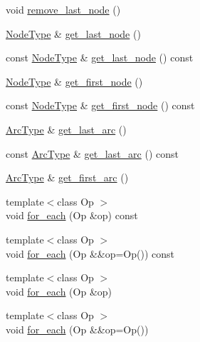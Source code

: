\begin{DoxyCompactItemize}
\item 
void \hyperlink{class_designar_1_1_path_a88a313439c8f4ea01f72d469b328039f}{remove\+\_\+last\+\_\+node} ()
\item 
\hyperlink{class_designar_1_1_path_a7b499fd50e96e3360968d4cfef7a3736}{Node\+Type} \& \hyperlink{class_designar_1_1_path_aff47c35e439520a807f2a83119a7937b}{get\+\_\+last\+\_\+node} ()
\item 
const \hyperlink{class_designar_1_1_path_a7b499fd50e96e3360968d4cfef7a3736}{Node\+Type} \& \hyperlink{class_designar_1_1_path_a4e80971589c8317a2e7f11c642ad2e19}{get\+\_\+last\+\_\+node} () const
\item 
\hyperlink{class_designar_1_1_path_a7b499fd50e96e3360968d4cfef7a3736}{Node\+Type} \& \hyperlink{class_designar_1_1_path_a7d45c6df09b310fc0c0a65bd3c8db109}{get\+\_\+first\+\_\+node} ()
\item 
const \hyperlink{class_designar_1_1_path_a7b499fd50e96e3360968d4cfef7a3736}{Node\+Type} \& \hyperlink{class_designar_1_1_path_a6750bfef2944f6c938bee68da8c904c6}{get\+\_\+first\+\_\+node} () const
\item 
\hyperlink{class_designar_1_1_path_a6e13966351659cedcf3233098b2b7384}{Arc\+Type} \& \hyperlink{class_designar_1_1_path_aabe99f57d8d1c3ee500f5d6655b4fe68}{get\+\_\+last\+\_\+arc} ()
\item 
const \hyperlink{class_designar_1_1_path_a6e13966351659cedcf3233098b2b7384}{Arc\+Type} \& \hyperlink{class_designar_1_1_path_a3766fdd25ef3f12780a96319e0b7807e}{get\+\_\+last\+\_\+arc} () const
\item 
\hyperlink{class_designar_1_1_path_a6e13966351659cedcf3233098b2b7384}{Arc\+Type} \& \hyperlink{class_designar_1_1_path_a24e7befc93ee9a9db24768f0d3c6ad22}{get\+\_\+first\+\_\+arc} ()
\item 
{\footnotesize template$<$class Op $>$ }\\void \hyperlink{class_designar_1_1_path_a72950bc3852a17d423982d55326b2382}{for\+\_\+each} (Op \&op) const
\item 
{\footnotesize template$<$class Op $>$ }\\void \hyperlink{class_designar_1_1_path_acc53d7be8093a53e860e283bcf96593f}{for\+\_\+each} (Op \&\&op=Op()) const
\item 
{\footnotesize template$<$class Op $>$ }\\void \hyperlink{class_designar_1_1_path_a3cfa609d28037e6da0ee380150369c7a}{for\+\_\+each} (Op \&op)
\item 
{\footnotesize template$<$class Op $>$ }\\void \hyperlink{class_designar_1_1_path_aaab972fd915daa207a31f6832a691ef7}{for\+\_\+each} (Op \&\&op=Op())

\end{DoxyCompactItemize}
